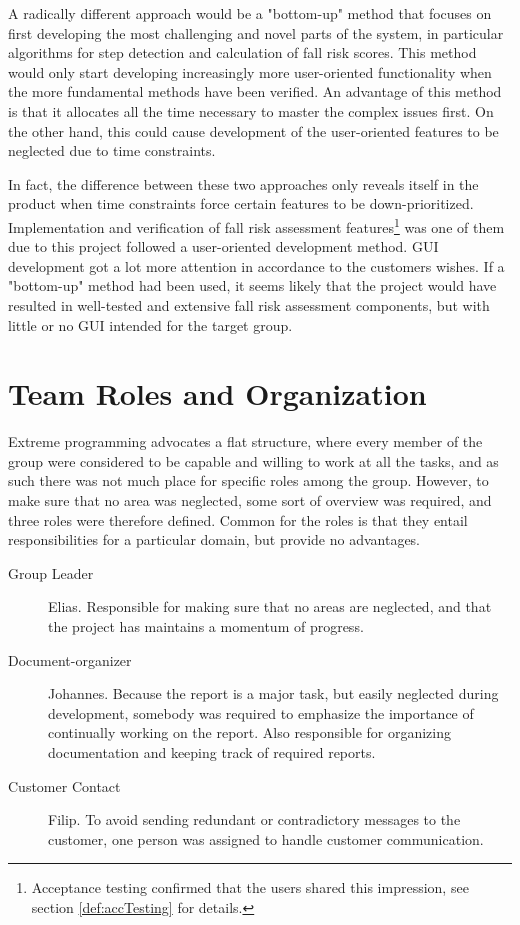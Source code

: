 A radically different approach would be a "bottom-up" method that focuses on first developing the most challenging and novel parts of the system, in particular algorithms for step detection and calculation of fall risk scores. This method would only start developing increasingly more user-oriented functionality when the more fundamental methods have been verified. An advantage of this method is that it allocates all the time necessary to master the complex issues first. On the other hand, this could cause development of the user-oriented features to be neglected due to time constraints. 

In fact, the difference between these two approaches only reveals itself in the product when time constraints force certain features to be down-prioritized. Implementation and verification of fall risk assessment features\footnote{Acceptance testing confirmed that the users shared this impression, see section \ref{def:accTesting} for details.} was one of them due to this project followed a user-oriented development method. GUI development got a lot more attention in accordance to the customers wishes. If a "bottom-up" method had been used, it seems likely that the project would have resulted in well-tested and extensive fall risk assessment components, but with little or no GUI intended for the target group. 

\section{Team Roles and Organization}
Extreme programming advocates a flat structure, where every member of the group were considered to be capable and willing to work at all the tasks, and as such there was not much place for specific roles among the group. However, to make sure that no area was neglected, some sort of overview was required, and three roles were therefore defined. Common for the roles is that they entail responsibilities for a particular domain, but provide no advantages.

\begin{description}
\item[Group Leader] Elias. Responsible for making sure that no areas are neglected, and that the project has maintains a momentum of progress.
\item[Document-organizer] Johannes. Because the report is a major task, but easily neglected during development, somebody was required to emphasize the importance of continually working on the report. Also responsible for organizing documentation and keeping track of required reports.
\item[Customer Contact] Filip. To avoid sending redundant or contradictory messages to the customer, one person was assigned to handle customer communication.
\end{description}
 
